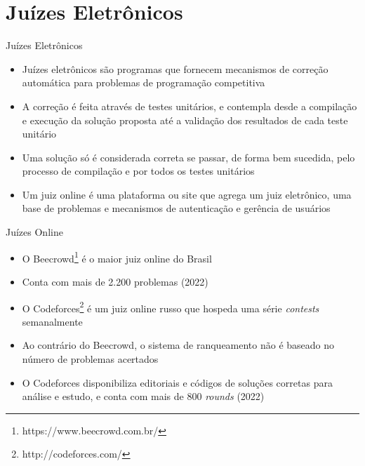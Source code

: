 \section{Juízes Eletrônicos}

\begin{frame}[fragile]{Juízes Eletrônicos}

    \begin{itemize}
        \item Juízes eletrônicos são programas que fornecem mecanismos de correção automática para
        problemas de programação competitiva
        \item A correção é feita através de testes unitários, e contempla desde a compilação e
        execução da solução proposta até a validação dos resultados de cada teste unitário
        \item Uma solução só é considerada correta se passar, de  forma  bem  sucedida,
        pelo  processo de  compilação  e por todos os testes unitários
        \item Um juiz online é uma plataforma ou site que agrega um juiz eletrônico, uma base de
        problemas e mecanismos de autenticação e gerência de usuários
    \end{itemize}

\end{frame}

\begin{frame}[fragile]{Juízes Online}

    \begin{itemize}
        \item O Beecrowd\footnote{https://www.beecrowd.com.br/}
        é o maior juiz online do Brasil

        \item Conta com mais de 2.200 problemas (2022)
        \item O Codeforces\footnote{http://codeforces.com/} é um juiz online russo que
        hospeda uma série \textit{contests} semanalmente
        \item Ao contrário do Beecrowd, o sistema de ranqueamento não é baseado no número de problemas
        acertados
        \item O Codeforces disponibiliza editoriais e códigos de soluções corretas para análise e
        estudo, e conta com mais de 800 \textit{rounds} (2022)
   \end{itemize}

\end{frame}

